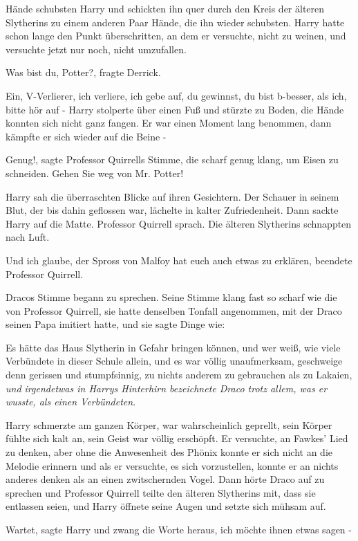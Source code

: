 Hände schubsten Harry und schickten ihn quer durch den Kreis der älteren
Slytherins zu einem anderen Paar Hände, die ihn wieder schubsten. Harry hatte
schon lange den Punkt überschritten, an dem er versuchte, nicht zu weinen, und
versuchte jetzt nur noch, nicht umzufallen.

\glqq{}Was bist du, Potter?\grqq{}, fragte Derrick.

\glqq{}Ein, V-Verlierer, ich verliere, ich gebe auf, du gewinnst, du bist
b-besser, als ich, bitte hör auf -\grqq{} Harry stolperte über einen Fuß und
stürzte zu Boden, die Hände konnten sich nicht ganz fangen. Er war einen Moment
lang benommen, dann kämpfte er sich wieder auf die Beine -

\glqq{}Genug!\grqq{}, sagte Professor Quirrells Stimme, die scharf genug klang,
um Eisen zu schneiden. \glqq{}Gehen Sie weg von Mr. Potter!\grqq{}

Harry sah die überraschten Blicke auf ihren Gesichtern. Der Schauer in seinem
Blut, der bis dahin geflossen war, lächelte in kalter Zufriedenheit. Dann sackte
Harry auf die Matte. Professor Quirrell sprach. Die älteren Slytherins
schnappten nach Luft.

\glqq{}Und ich glaube, der Spross von Malfoy hat euch auch etwas zu
erklären\grqq{}, beendete Professor Quirrell.

Dracos Stimme begann zu sprechen. Seine Stimme klang fast so scharf wie die von
Professor Quirrell, sie hatte denselben Tonfall angenommen, mit der Draco seinen
Papa imitiert hatte, und sie sagte Dinge wie:

Es hätte das Haus Slytherin in Gefahr bringen können, und wer weiß, wie viele
Verbündete in dieser Schule allein, und es war völlig unaufmerksam, geschweige
denn gerissen und stumpfsinnig, zu nichts anderem zu gebrauchen als zu Lakaien,
\emph{und irgendetwas in Harrys Hinterhirn bezeichnete Draco trotz allem, was er
wusste, als einen Verbündeten}.

Harry schmerzte am ganzen Körper, war wahrscheinlich geprellt, sein Körper
fühlte sich kalt an, sein Geist war völlig erschöpft. Er versuchte, an Fawkes'
Lied zu denken, aber ohne die Anwesenheit des Phönix konnte er sich nicht an die
Melodie erinnern und als er versuchte, es sich vorzustellen, konnte er an nichts
anderes denken als an einen zwitschernden Vogel. Dann hörte Draco auf zu
sprechen und Professor Quirrell teilte den älteren Slytherins mit, dass sie
entlassen seien, und Harry öffnete seine Augen und setzte sich mühsam auf.

\glqq{}Wartet\grqq{}, sagte Harry und zwang die Worte heraus, \glqq{}ich möchte
ihnen etwas sagen -\grqq{}

